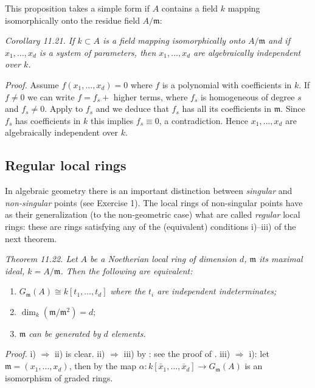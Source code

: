 This proposition takes a simple form if $A$ contains a field $k$ mapping isomorphically onto the residue field $A/\mathfrak m$:

\medskip
\noindent\textit{Corollary 11.21. If $k\subset A$ is a field mapping isomorphically onto $A/\mathfrak m$ and if $x_1,\ldots,x_d$ is a system of parameters, then $x_1,\ldots,x_d$ are algebraically independent over $k$.}

\textit{Proof.} Assume $f(x_1,\ldots,x_d)=0$ where $f$ is a polynomial with coefficients in $k$. If $f\neq0$ we can write $f=f_s+$ higher terms, where $f_s$ is homogeneous of degree $s$ and $f_s\neq0$. Apply  to $f_s$ and we deduce that $f_s$ has all its coefficients in $\mathfrak m$. Since $f_s$ has coefficients in $k$ this implies $f_s\equiv0$, a contradiction. Hence $x_1,\ldots,x_d$ are algebraically independent over $k$. \proofbox

\subsection{Regular local rings}

In algebraic geometry there is an important distinction between \textit{singular} and \textit{non-singular} points (see Exercise 1). The local rings of non-singular points have as their generalization (to the non-geometric case) what are called \textit{regular} local rings: these are rings satisfying any of the (equivalent) conditions i)--iii) of the next theorem.

\medskip
\noindent\textit{Theorem 11.22. Let $A$ be a Noetherian local ring of dimension $d$, $\mathfrak m$ its maximal ideal, $k=A/\mathfrak m$. Then the following are equivalent:}
\begin{enumerate}
\item[i)] $G_{\mathfrak m}(A)\cong k[t_1,\ldots,t_d]$ \textit{where the $t_i$ are independent indeterminates;}
\item[ii)] $\dim_k(\mathfrak m/\mathfrak m^2)=d$;
\item[iii)] $\mathfrak m$ \textit{can be generated by $d$ elements.}
\end{enumerate}
\textit{Proof.} i) $\Rightarrow$ ii) is clear. ii) $\Rightarrow$ iii) by : see the proof of . iii) $\Rightarrow$ i): let $\mathfrak m=(x_1,\ldots,x_d)$, then by  the map $\alpha:k[\bar x_1,\ldots,\bar x_d]\longrightarrow G_{\mathfrak m}(A)$ is an isomorphism of graded rings. \proofbox

